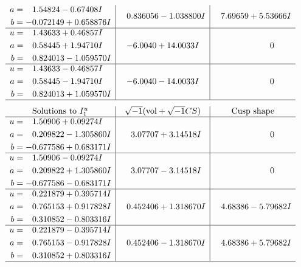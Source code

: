 \documentclass[1p]{elsarticle_modified}
\theoremstyle{definition}
\newcommand{\I}{\sqrt{-1}}
\begin{document}
$$\begin{array}{c|c|c}
\begin{aligned}
a &= \phantom{-}1.54824 - 0.67408 I \\
b &= -0.072149 + 0.658876 I\end{aligned}
 & \phantom{-}0.836056 - 1.038800 I & \phantom{-}7.69659 + 5.53666 I \\ \hline\begin{aligned}
u &= \phantom{-}1.43633 + 0.46857 I \\
a &= \phantom{-}0.58445 + 1.94710 I \\
b &= \phantom{-}0.824013 - 1.059570 I\end{aligned}
 & -6.0040 + 14.0033 I & \phantom{-0.000000 } 0 \\ \hline\begin{aligned}
u &= \phantom{-}1.43633 - 0.46857 I \\
a &= \phantom{-}0.58445 - 1.94710 I \\
b &= \phantom{-}0.824013 + 1.059570 I\end{aligned}
 & -6.0040 - 14.0033 I & \phantom{-0.000000 } 0\\
 \hline 
 \end{array}$$\newpage$$\begin{array}{c|c|c}  
\text{Solutions to }I^u_{1}& \I (\text{vol} + \sqrt{-1}CS) & \text{Cusp shape}\\
 \hline 
\begin{aligned}
u &= \phantom{-}1.50906 + 0.09274 I \\
a &= \phantom{-}0.209822 - 1.305860 I \\
b &= -0.677586 + 0.683171 I\end{aligned}
 & \phantom{-}3.07707 + 3.14518 I & \phantom{-0.000000 } 0 \\ \hline\begin{aligned}
u &= \phantom{-}1.50906 - 0.09274 I \\
a &= \phantom{-}0.209822 + 1.305860 I \\
b &= -0.677586 - 0.683171 I\end{aligned}
 & \phantom{-}3.07707 - 3.14518 I & \phantom{-0.000000 } 0 \\ \hline\begin{aligned}
u &= \phantom{-}0.221879 + 0.395714 I \\
a &= \phantom{-}0.765153 + 0.917828 I \\
b &= \phantom{-}0.310852 - 0.803316 I\end{aligned}
 & \phantom{-}0.452406 + 1.318670 I & \phantom{-}4.68386 - 5.79682 I \\ \hline\begin{aligned}
u &= \phantom{-}0.221879 - 0.395714 I \\
a &= \phantom{-}0.765153 - 0.917828 I \\
b &= \phantom{-}0.310852 + 0.803316 I\end{aligned}
 & \phantom{-}0.452406 - 1.318670 I & \phantom{-}4.68386 + 5.79682 I\\
 \hline 
 \end{array}$$\newpage\newpage\renewcommand{\arraystretch}{1}
\end{document}
